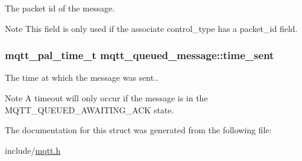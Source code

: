 The packet id of the message. 

\begin{DoxyNote}{Note}
This field is only used if the associate {\ttfamily control\+\_\+type} has a {\ttfamily packet\+\_\+id} field. 
\end{DoxyNote}
\subsubsection[{\texorpdfstring{time\+\_\+sent}{time_sent}}]{\setlength{\rightskip}{0pt plus 5cm}mqtt\+\_\+pal\+\_\+time\+\_\+t mqtt\+\_\+queued\+\_\+message\+::time\+\_\+sent}\hypertarget{structmqtt__queued__message_a3bf569b81ee8d77d9986fa35ce22ab3f}{}\label{structmqtt__queued__message_a3bf569b81ee8d77d9986fa35ce22ab3f}


The time at which the message was sent.. 

\begin{DoxyNote}{Note}
A timeout will only occur if the message is in the M\+Q\+T\+T\+\_\+\+Q\+U\+E\+U\+E\+D\+\_\+\+A\+W\+A\+I\+T\+I\+N\+G\+\_\+\+A\+CK {\ttfamily state}. 
\end{DoxyNote}


The documentation for this struct was generated from the following file\+:\begin{DoxyCompactItemize}
\item 
include/\hyperlink{mqtt_8h}{mqtt.\+h}\end{DoxyCompactItemize}
